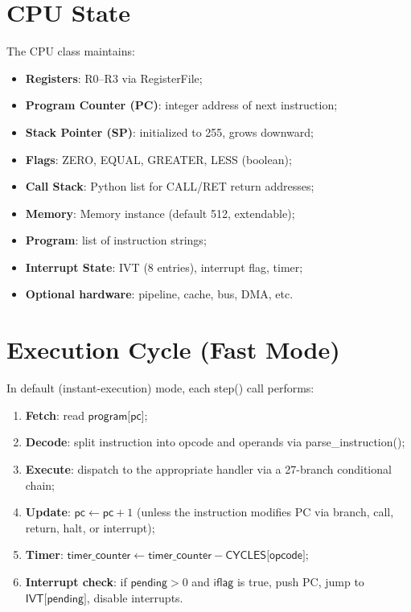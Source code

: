 \documentclass[12pt,a4paper,twoside]{book}
\theoremstyle{trinarytheorem}
\theoremstyle{trinarydefinition}
\newcommand{\code}[1]{\textsf{#1}}
\begin{document}
\section{CPU State}

The \code{CPU} class maintains:
\begin{itemize}
    \item \textbf{Registers}: R0--R3 via \code{RegisterFile};
    \item \textbf{Program Counter (PC)}: integer address of next instruction;
    \item \textbf{Stack Pointer (SP)}: initialized to 255, grows downward;
    \item \textbf{Flags}: ZERO, EQUAL, GREATER, LESS (boolean);
    \item \textbf{Call Stack}: Python list for CALL/RET return addresses;
    \item \textbf{Memory}: \code{Memory} instance (default 512, extendable);
    \item \textbf{Program}: list of instruction strings;
    \item \textbf{Interrupt State}: IVT (8 entries), interrupt flag, timer;
    \item \textbf{Optional hardware}: pipeline, cache, bus, DMA, etc.
\end{itemize}

\section{Execution Cycle (Fast Mode)}

In default (instant-execution) mode, each \code{step()} call performs:

\begin{enumerate}
    \item \textbf{Fetch}: read $\code{program[pc]}$;
    \item \textbf{Decode}: split instruction into opcode and operands via
          \code{parse\_instruction()};
    \item \textbf{Execute}: dispatch to the appropriate handler via a 27-branch
          conditional chain;
    \item \textbf{Update}: $\code{pc} \gets \code{pc} + 1$ (unless the instruction
          modifies PC via branch, call, return, halt, or interrupt);
    \item \textbf{Timer}: $\code{timer\_counter} \gets \code{timer\_counter}
          - \code{CYCLES[opcode]}$;
    \item \textbf{Interrupt check}: if $\code{pending} > 0$ and $\code{iflag}$
          is true, push PC, jump to $\code{IVT[pending]}$, disable interrupts.
\end{enumerate}
\end{document}
